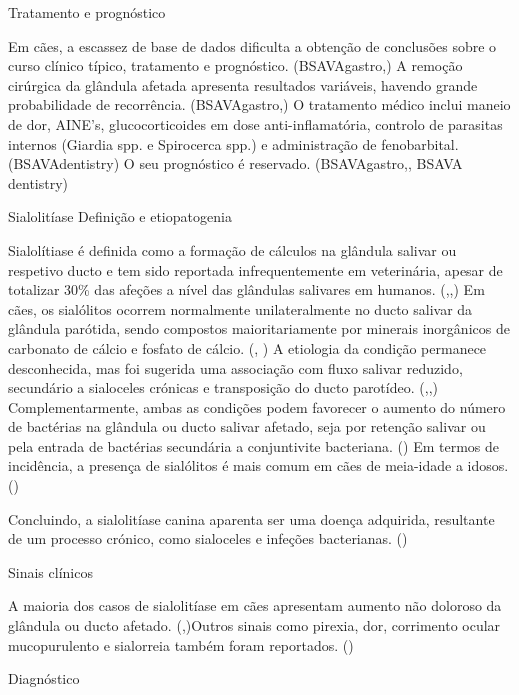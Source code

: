 Tratamento e prognóstico


Em cães, a escassez de base de dados dificulta a obtenção de conclusões sobre o curso clínico típico, tratamento e prognóstico. (BSAVAgastro,\cite{Mukaratirwa2015}) A remoção cirúrgica da glândula afetada apresenta resultados variáveis, havendo grande probabilidade de recorrência. (BSAVAgastro,\cite{Mukaratirwa2015}) O tratamento médico inclui maneio de dor, AINE’s, glucocorticoides em dose anti-inflamatória, controlo de parasitas internos (Giardia spp. e Spirocerca spp.) e administração de fenobarbital. (BSAVAdentistry) O seu prognóstico é reservado. (BSAVAgastro,\cite{Mukaratirwa2015}, BSAVA dentistry)



Sialolitíase
Definição e etiopatogenia


Sialolítiase é definida como a formação de cálculos na glândula salivar ou respetivo ducto e tem sido reportada infrequentemente em veterinária, apesar de totalizar 30\% das afeções a nível das glândulas salivares em humanos. (\cite{cvj},\cite{Han2016},\cite{Ryan2008}) Em cães, os sialólitos ocorrem normalmente unilateralmente no ducto salivar da glândula parótida, sendo compostos maioritariamente por minerais inorgânicos de carbonato de cálcio e fosfato de cálcio. (\cite{cvj}, \cite{Han2016}) A etiologia da condição permanece desconhecida, mas foi sugerida uma associação com fluxo salivar reduzido, secundário a sialoceles crónicas e transposição do ducto parotídeo. (\cite{cvj},\cite{Han2016},\cite{Ryan2008}) Complementarmente, ambas as condições podem favorecer o aumento do número de bactérias na glândula ou ducto salivar afetado, seja por retenção salivar ou pela entrada de bactérias secundária a conjuntivite bacteriana. (\cite{Han2016}) 
Em termos de incidência, a presença de sialólitos é mais comum em cães de meia-idade a idosos. (\cite{Han2016}) 


Concluindo, a sialolitíase canina aparenta ser uma doença adquirida, resultante de um processo crónico, como sialoceles e infeções bacterianas. (\cite{Han2016})


Sinais clínicos


A maioria dos casos de sialolitíase em cães apresentam aumento não doloroso da glândula ou ducto afetado. (\cite{Han2016},\cite{cvj})Outros sinais como pirexia, dor, corrimento ocular mucopurulento e sialorreia também foram reportados. (\cite{Han2016})


Diagnóstico



